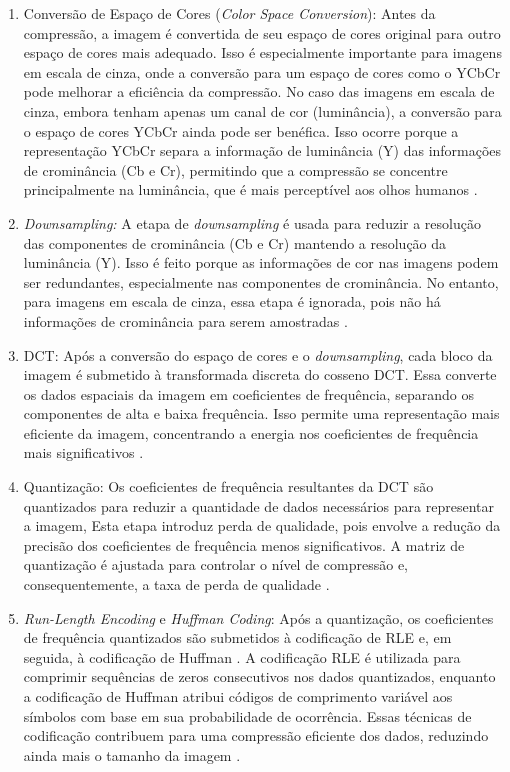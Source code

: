 \begin{enumerate}
    \item Conversão de Espaço de Cores (\textit{Color Space Conversion}):
    Antes da compressão, a imagem é convertida de  seu espaço de cores original para outro espaço de cores mais adequado. Isso é especialmente importante para imagens em  escala de cinza, onde a conversão para um espaço de cores como o YCbCr pode melhorar a eficiência da compressão. No caso das imagens em escala de cinza, embora tenham apenas um canal de cor (luminância), a conversão para o espaço de cores YCbCr ainda pode ser benéfica. Isso ocorre porque a representação YCbCr separa a informação de luminância (Y) das informações de crominância (Cb e Cr), permitindo que a compressão se concentre principalmente na luminância, que é mais perceptível aos olhos humanos \cite{miano1999compressed}.

    \item \textit{Downsampling:}
    A etapa de \textit{downsampling} é usada para reduzir a resolução das componentes de crominância (Cb e Cr) mantendo a resolução da luminância (Y). Isso é feito porque as informações de cor nas imagens podem ser redundantes, especialmente nas componentes de crominância. No entanto, para imagens em escala de cinza, essa etapa é ignorada, pois não há informações de crominância para serem amostradas \cite{miano1999compressed}.

    \item \acrshort{DCT}:
    Após a conversão do espaço de cores e o \textit{downsampling}, cada bloco da imagem é submetido à transformada discreta do cosseno \acrshort{DCT}. Essa converte os dados espaciais da imagem em coeficientes de frequência, separando os componentes de alta e baixa frequência. Isso permite uma representação mais eficiente da imagem, concentrando a energia nos coeficientes de frequência mais significativos \cite{miano1999compressed}.

    \item Quantização:
    Os coeficientes de frequência resultantes da \acrshort{DCT} são quantizados para reduzir a quantidade de dados necessários para representar a imagem, Esta etapa introduz perda de qualidade, pois envolve a redução da precisão dos coeficientes de frequência menos significativos. A matriz de quantização é ajustada para controlar o nível de compressão e, consequentemente, a taxa de perda de qualidade \cite{miano1999compressed}.

    \item \textit{Run-Length Encoding} e \textit{Huffman Coding}:
    Após a quantização, os coeficientes de frequência quantizados são submetidos à codificação de \acrfull{RLE} e, em seguida, à codificação de Huffman \cite{huffmanArticle}. A codificação \acrshort{RLE} é utilizada para comprimir sequências de zeros consecutivos nos dados quantizados, enquanto a codificação de Huffman \cite{huffmanArticle} atribui códigos de comprimento variável aos símbolos com base em sua probabilidade de ocorrência. Essas técnicas de codificação contribuem para uma compressão eficiente dos dados, reduzindo ainda mais o tamanho da imagem \cite{miano1999compressed}.
\end{enumerate}

